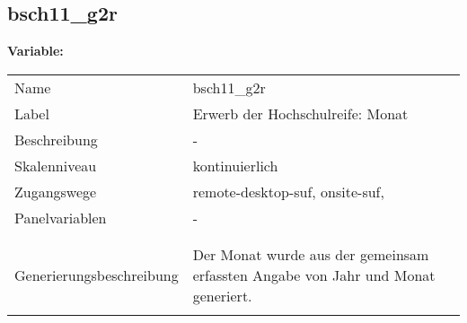 	
	
	\subsection{bsch11\_g2r}
	\label{subSection:bsch11_g2r}

	\noindent\textbf{Variable:}\\
		\begin{tabular}{lL{11.3cm}}
			\label{tableVariable:bsch11_g2r}
			Name & bsch11\_g2r \\
			Label & Erwerb der Hochschulreife: Monat \\
			Beschreibung & - \\
			Skalenniveau & kontinuierlich \\
			Zugangswege &
				remote-desktop-suf,
				onsite-suf,
 \\
			Panelvariablen & -
			 \\
			 \\
 \\
					Generierungsbeschreibung & Der Monat wurde aus der gemeinsam erfassten Angabe von Jahr und Monat generiert. 
				 \\	
			 \\
		\end{tabular}





